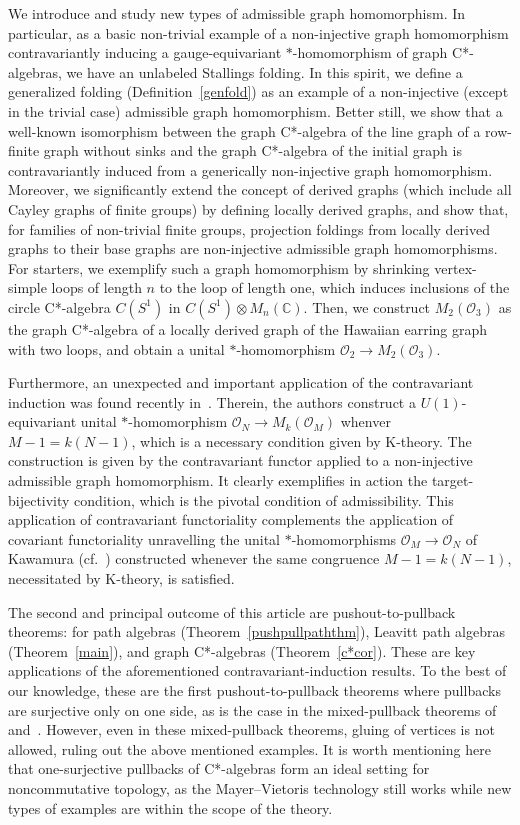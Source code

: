 \documentclass[12pt,times,a4paper]{amsart}
\numberwithin{equation}{section}
\numberwithin{equation}{section}
\begin{document}
We introduce and study new types of admissible graph homomorphism.
In particular, as a basic
non-trivial example of a non-injective graph homomorphism contravariantly inducing a gauge-equivariant $*$-homomorphism of graph 
C*-algebras, we have an unlabeled Stallings folding. In this spirit, we define a generalized folding
(Definition~\ref{genfold}) as an example of a non-injective (except in the trivial case) admissible graph homomorphism. 
Better still,  we show that a well-known isomorphism between 
the graph C*-algebra of the line graph of a row-finite
graph without sinks and the graph C*-algebra of the initial graph is contravariantly induced from a generically non-injective
graph homomorphism. Moreover, we significantly extend the concept of derived graphs (which include all Cayley graphs of finite groups) 
by defining locally derived graphs,
and show that, for families of non-trivial finite groups, projection foldings from locally derived graphs to their base  graphs
are non-injective admissible graph homomorphisms. For starters, we exemplify such a graph homomorphism by 
shrinking vertex-simple loops of length $n$ to the loop of length one, 
which induces  inclusions of  the circle C*-algebra $C(S^1)$  in 
$C(S^1)\!\otimes\! M_n(\mathbb{C})$. Then, we construct
$M_2(\mathcal{O}_3)$ as the graph C*-algebra of a locally derived graph of the Hawaiian earring graph
with two loops, and obtain a unital $*$-homomorphism $\mathcal{O}_2\to M_2(\mathcal{O}_3)$.

Furthermore, an unexpected and important application of the contravariant induction was found recently in~\cite{hl24}. Therein, the authors
construct a $U(1)$-equivariant unital $*$-homomorphism $\mathcal{O}_N\to M_k(\mathcal{O}_M)$ whenver $M-1=k(N-1)$, which is a necessary
condition given by K-theory. The construction is given by the contravariant functor applied to a non-injective admissible graph homomorphism.
It clearly exemplifies in action the target-bijectivity condition, which is the pivotal condition of admissibility. This application of contravariant
functoriality complements the application of covariant functoriality \cite{ht23} unravelling the unital \mbox{$*$-homomorphisms} $\mathcal{O}_M\to \mathcal{O}_N$
of Kawamura \cite[Lemma~2.1 and Section~6.1]{k-k09} (cf.~\cite[Section~3.3]{j-c77}) constructed whenever the same congruence $M-1=k(N-1)$, necessitated by K-theory, is satisfied.


The second and principal outcome of this article are pushout-to-pullback theorems: 
for path algebras (Theorem~\ref{pushpullpaththm}),
 Leavitt path algebras (Theorem~\ref{main}), and graph C*-algebras (Theorem~\ref{c*cor}). 
These are key applications of the aforementioned contravariant-induction results. To the best of our knowledge, these are the
first pushout-to-pullback theorems where pullbacks are surjective only on one side, as is the case in the mixed-pullback theorems
of \cite{cht21} and~\cite{ht23}. However, even in these mixed-pullback theorems, gluing of vertices is not allowed, ruling out
the above mentioned examples. It is worth mentioning here that one-surjective pullbacks of C*-algebras
form an ideal setting for noncommutative topology, as the Mayer--Vietoris technology still works while new types of examples
are within the scope of the theory.
\end{document}
